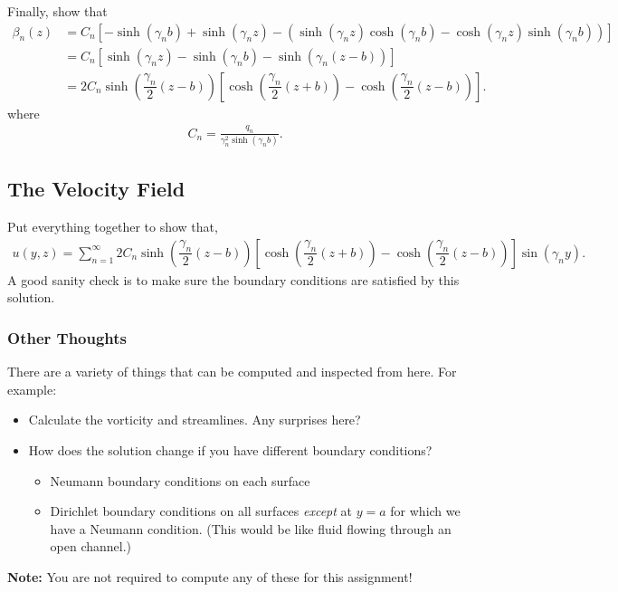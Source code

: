 \documentclass[11pt]{article}
\begin{document}
    Finally, show that 
    \begin{align}
      \beta_{n}\left(z\right) &= C_{n} 
        \left[-\sinh\left(\gamma_{n}b\right) + \sinh\left(\gamma_{n}z\right) - 
          \left(\sinh\left(\gamma_{n}z\right)\cosh\left(\gamma_{n}b\right) - 
            \cosh\left(\gamma_{n}z\right)\sinh\left(\gamma_{n}b\right)\right)\right] \\
      &=  C_{n}
           \left[\sinh\left(\gamma_{n}z\right) - \sinh\left(\gamma_{n}b\right) - 
            \sinh\left(\gamma_{n}\left(z-b\right)\right)\right] \\
      &= 2C_{n}\sinh\left(\dfrac{\gamma_{n}}{2}\left(z-b\right)\right) 
           \left[\cosh\left(\dfrac{\gamma_{n}}{2}\left(z+b\right)\right) - 
             \cosh\left(\dfrac{\gamma_{n}}{2}\left(z-b\right)\right)\right].
    \end{align}
    where 
    \begin{align}
      C_{n} = \frac{q_{n}}{\gamma_{n}^{2}\sinh\left(\gamma_{n}b\right)}. 
    \end{align}



    \subsection{The Velocity Field}
    Put everything together to show that,
    \begin{align}
      u\left(y,z\right) = \sum_{n=1}^{\infty}{2C_{n} 
        \sinh\left(\dfrac{\gamma_{n}}{2}\left(z-b\right)\right)\left[\cosh\left(\dfrac{\gamma_{n}}{2}\left(z+b\right)\right) - 
          \cosh\left(\dfrac{\gamma_{n}}{2}\left(z-b\right)\right)\right]\sin\left(\gamma_{n}y\right)}.
    \end{align}
    A good sanity check is to make sure the boundary conditions are satisfied by this solution.

    \subsubsection{Other Thoughts}
    There are a variety of things that can be computed and inspected from here.  For example:
    \begin{itemize}
      \item Calculate the vorticity and streamlines.  Any surprises here?
      \item How does the solution change if you have different boundary conditions?
        \begin{itemize}
          \item Neumann boundary conditions on each surface 
          \item Dirichlet boundary conditions on all surfaces \textit{except} at $y=a$ for which we have a Neumann condition.
(This would be like fluid flowing through an open channel.)
        \end{itemize}
    \end{itemize}
    \textbf{Note:}  You are not required to compute any of these for this assignment!
\end{document}
